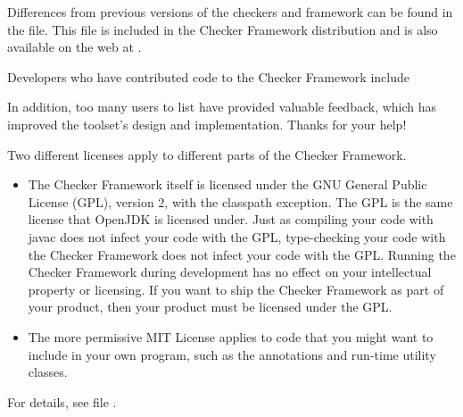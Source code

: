 
Differences from previous versions of the checkers and framework can be found
in the  file.  This file is included in the
Checker Framework distribution and is also available on the web at
.

Developers who have contributed code to the Checker Framework include

In addition, too many users to list have provided valuable feedback, which
has improved the toolset's design and implementation.
Thanks for your help!



Two different licenses apply to different parts of the Checker Framework.
\begin{itemize}
\item
The Checker Framework itself is licensed under the GNU General Public License
(GPL), version 2, with the classpath exception.
The GPL is the same license that OpenJDK is licensed
under.  Just as compiling your code with javac does not infect your code
with the GPL, type-checking your code with the Checker Framework does not
infect your code with the GPL\@.  Running the Checker Framework during
development has no effect on your intellectual property or licensing.  If
you want to ship the Checker Framework as part of your product, then your
product must be licensed under the GPL\@.
\item
The more permissive MIT License applies
to code that you might want to include in your own
program, such as the annotations and run-time utility classes.
\end{itemize}
\noindent
For details, see file
.



